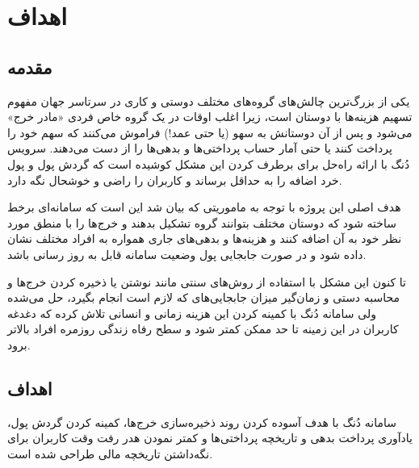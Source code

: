 

\chapter{
اهداف
}



\section{مقدمه}

یکی از بزرگ‌ترین چالش‌های گروه‌های مختلف دوستی و کاری در سرتاسر جهان مفهوم تسهیم هزینه‌ها با دوستان است، زیرا اغلب اوقات در یک گروه خاص فردی «مادر خرج» می‌شود و پس از آن دوستانش به سهو (یا حتی عمد!) فراموش می‌کنند که سهم خود را پرداخت کنند یا حتی آمار حساب پرداختی‌ها و بدهی‌ها را از دست می‌دهند.
سرویس دُنگ با ارائه راه‌حل‌ برای برطرف کردن این مشکل کوشیده است که گردش پول و پول خرد اضافه را به حداقل برساند و کاربران را راضی و خوشحال نگه دارد.

هدف اصلی این پروژه با توجه به ماموریتی که بیان شد این است که سامانه‌ای برخط ساخته شود که دوستان مختلف بتوانند گروه‌ تشکیل بدهند و خرج‌ها را با منطق مورد نظر خود به آن اضافه کنند و هزینه‌ها و بدهی‌های جاری همواره به افراد مختلف نشان داده شود و در صورت جابجایی پول وضعیت سامانه قابل به روز رسانی باشد.

تا کنون این مشکل با استفاده از روش‌های سنتی مانند نوشتن یا ذخیره کردن خرج‌ها و محاسبه دستی و زمان‌گیر میزان جابجایی‌های که لازم است انجام بگیرد، حل می‌شده ولی سامانه دُنگ با کمینه کردن این هزینه زمانی و انسانی تلاش کرده که دغدغه کاربران در این زمینه تا حد ممکن کمتر شود و سطح رفاه زندگی روزمره افراد بالاتر برود.

\section{اهداف}

سامانه دُنگ با هدف آسوده کردن روند ذخیره‌سازی خرج‌ها، کمینه کردن گردش پول، یادآوری پرداخت بدهی و تاریخچه پرداختی‌ها و کمتر نمودن هدر رفت وقت کاربران برای نگه‌داشتن تاریخچه مالی طراحی شده است.


